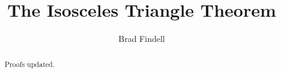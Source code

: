 \documentclass[nooutcomes]{ximera}
\title{The Isosceles Triangle Theorem}
\author{Brad Findell}
\begin{document}
\begin{abstract}
Proofs updated. 
\end{abstract}
\maketitle

%
%


\end{document}
